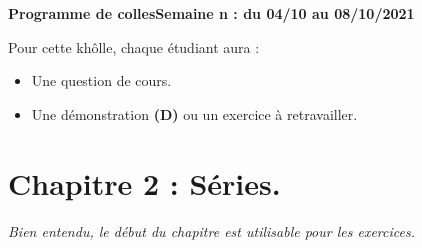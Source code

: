 \documentclass[twoside,a4paper,french,10pt]{VcCours}
\begin{document}

\begin{center}
\large\bf
Programme de collesSemaine n : du 04/10 au 08/10/2021
\end{center}
\separationTitre


Pour cette khôlle, chaque étudiant aura :
\begin{itemize}
\item Une question de cours.
\item Une démonstration \textbf{(D)} ou un exercice à retravailler.
\end{itemize}


\medskip 
\section*{Chapitre 2 : Séries.}
\emph{Bien entendu, le début du chapitre est utilisable pour les exercices.}
\end{document}
